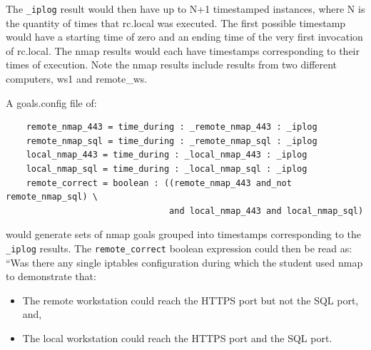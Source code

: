 \documentclass[12pt]{article}
\begin{document}
\noindent The {\tt \_iplog} result would then have up to N+1 timestamped instances,
where N is the quantity of times that rc.local was executed. The first possible
timestamp would have a starting time of zero and an ending time of the very first
invocation of rc.local.  The nmap results would each have timestamps corresponding
to their times of execution.  Note the nmap results include results from two different
computers, ws1 and remote\_ws.

A goals.config file of:
\begin{verbatim}
    remote_nmap_443 = time_during : _remote_nmap_443 : _iplog
    remote_nmap_sql = time_during : _remote_nmap_sql : _iplog
    local_nmap_443 = time_during : _local_nmap_443 : _iplog
    local_nmap_sql = time_during : _local_nmap_sql : _iplog
    remote_correct = boolean : ((remote_nmap_443 and_not remote_nmap_sql) \
                                and local_nmap_443 and local_nmap_sql)
\end{verbatim}
\noindent would generate sets of nmap goals grouped into timestamps corresponding to the
{\tt \_iplog} results.  The {\tt remote\_correct} boolean expression could then be read as: 
``Was there any
single iptables configuration during which the student used nmap to demonstrate that:
\begin{itemize}
\item The remote workstation could reach the HTTPS port but not the SQL port, and,
\item The local workstation could reach the HTTPS port and the SQL port.
\end{itemize}
\end{document}
